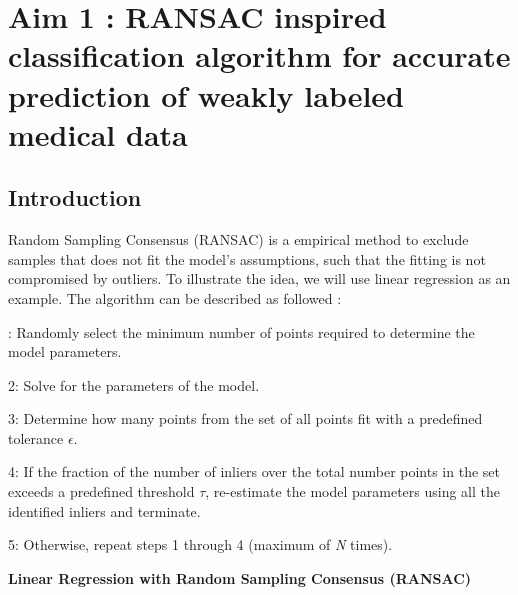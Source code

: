 \documentclass[a4paper, times, 12pt, ,onecolumn,oneside,top=1.0cm,bottom=1.0cm,left=1.0 cm,right=1cm]{article}
\begin{document}
\section{Aim 1 : RANSAC inspired classification algorithm for accurate prediction of weakly labeled medical data} 
    
\subsection{Introduction}
Random Sampling Consensus (RANSAC)\cite{10.1145/358669.358692}  is a empirical method to exclude samples that does not fit the model's assumptions, such that the fitting is not compromised by outliers. To illustrate the idea, we will use linear regression as an example. The algorithm can be described as followed :

\begin{algorithm}
: Randomly select the minimum number of points required to determine the model parameters.
 
 2: Solve for the parameters of the model.
 
 3: Determine how many points from the set of all points fit with a predefined tolerance $\epsilon$.
 
 4: If the fraction of the number of inliers over the total number points in the set exceeds a predefined threshold $\tau$, re-estimate the model parameters using all the identified inliers and terminate.
 
 5: Otherwise, repeat steps 1 through 4 (maximum of \textit{N} times).
\caption{\textbf{ Linear Regression with Random Sampling Consensus (RANSAC)  }}
 \end{algorithm}
    
\end{document}
